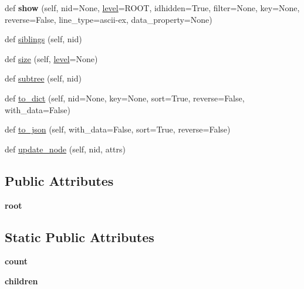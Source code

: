 \begin{DoxyCompactItemize}
\item 
\mbox{\label{classapp_1_1main_1_1treelib_1_1tree_1_1Tree_a8bb200b89d576eb8a0d077b1d9afe75f}} 
def {\bfseries show} (self, nid=None, \mbox{\hyperlink{classapp_1_1main_1_1treelib_1_1tree_1_1Tree_a3d528173abf063f97e6dfbcf29a0564b}{level}}=R\+O\+OT, idhidden=True, filter=None, key=None, reverse=False, line\+\_\+type=\textquotesingle{}ascii-\/ex\textquotesingle{}, data\+\_\+property=None)
\item 
def \mbox{\hyperlink{classapp_1_1main_1_1treelib_1_1tree_1_1Tree_ad1ec030b369120a15221ee5b5b1b52e7}{siblings}} (self, nid)
\item 
def \mbox{\hyperlink{classapp_1_1main_1_1treelib_1_1tree_1_1Tree_ab647e277f063d1ad6ec236264d2a198f}{size}} (self, \mbox{\hyperlink{classapp_1_1main_1_1treelib_1_1tree_1_1Tree_a3d528173abf063f97e6dfbcf29a0564b}{level}}=None)
\item 
def \mbox{\hyperlink{classapp_1_1main_1_1treelib_1_1tree_1_1Tree_aed6f1044c77dbea0d03f2858e3a43eb4}{subtree}} (self, nid)
\item 
def \mbox{\hyperlink{classapp_1_1main_1_1treelib_1_1tree_1_1Tree_ad3d956786e8d7e468425d15dcdd929d0}{to\+\_\+dict}} (self, nid=None, key=None, sort=True, reverse=False, with\+\_\+data=False)
\item 
def \mbox{\hyperlink{classapp_1_1main_1_1treelib_1_1tree_1_1Tree_aa2a265f8990cbd53fbf80f5ef5b49b20}{to\+\_\+json}} (self, with\+\_\+data=False, sort=True, reverse=False)
\item 
def \mbox{\hyperlink{classapp_1_1main_1_1treelib_1_1tree_1_1Tree_a2cdb045aff10eb712ef0109997553a25}{update\+\_\+node}} (self, nid, attrs)
\end{DoxyCompactItemize}
\subsection*{Public Attributes}
\begin{DoxyCompactItemize}
\item 
\mbox{\label{classapp_1_1main_1_1treelib_1_1tree_1_1Tree_a906fd88dfeeffa2729b9a2f5ab01d36d}} 
{\bfseries root}
\end{DoxyCompactItemize}
\subsection*{Static Public Attributes}
\begin{DoxyCompactItemize}
\item 
\mbox{\label{classapp_1_1main_1_1treelib_1_1tree_1_1Tree_a21ee57e8d7abc87b9edf7f0f4d5c7a11}} 
{\bfseries count}
\item 
\mbox{\label{classapp_1_1main_1_1treelib_1_1tree_1_1Tree_a3abae45851124cd925789ffc4e914b40}} 
{\bfseries children}
\end{DoxyCompactItemize}


